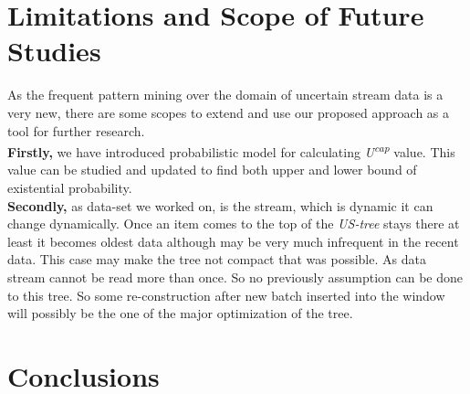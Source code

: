\section{Limitations and Scope of Future Studies}
As the frequent pattern mining over the domain of uncertain stream data is a very new, there are some scopes to extend and use our proposed approach as a tool for further research.\\ 
\textbf{Firstly,} we have introduced probabilistic model for calculating \emph{U\textsuperscript{cap}} value. This value can be studied and updated to find both upper and lower bound of existential probability.\\
\textbf{Secondly,} as data-set we worked on, is the stream, which is dynamic it can change dynamically. Once an item comes to the top of the \emph{US-tree} stays there at least it becomes oldest data although may be very much infrequent in the recent data. This case may make the tree not compact that was possible. As data stream cannot be read more than once. So no previously assumption can be done to this tree. So some re-construction after new batch inserted into the window will possibly be the one of the major optimization of the tree.
\section{Conclusions}
